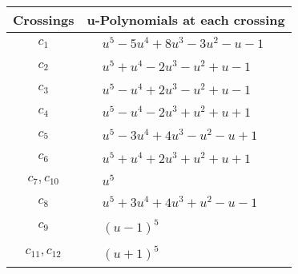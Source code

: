 \documentclass[1p]{elsarticle_modified}
\theoremstyle{definition}
\begin{document}
\begin{tabular}{m{50pt}|m{274pt}}
Crossings & \hspace{64pt}u-Polynomials at each crossing \\
\hline $$\begin{aligned}c_{1}\end{aligned}$$&$\begin{aligned}
&u^5-5 u^4+8 u^3-3 u^2- u-1
\end{aligned}$\\
\hline $$\begin{aligned}c_{2}\end{aligned}$$&$\begin{aligned}
&u^5+u^4-2 u^3- u^2+u-1
\end{aligned}$\\
\hline $$\begin{aligned}c_{3}\end{aligned}$$&$\begin{aligned}
&u^5- u^4+2 u^3- u^2+u-1
\end{aligned}$\\
\hline $$\begin{aligned}c_{4}\end{aligned}$$&$\begin{aligned}
&u^5- u^4-2 u^3+u^2+u+1
\end{aligned}$\\
\hline $$\begin{aligned}c_{5}\end{aligned}$$&$\begin{aligned}
&u^5-3 u^4+4 u^3- u^2- u+1
\end{aligned}$\\
\hline $$\begin{aligned}c_{6}\end{aligned}$$&$\begin{aligned}
&u^5+u^4+2 u^3+u^2+u+1
\end{aligned}$\\
\hline $$\begin{aligned}c_{7},c_{10}\end{aligned}$$&$\begin{aligned}
&u^5
\end{aligned}$\\
\hline $$\begin{aligned}c_{8}\end{aligned}$$&$\begin{aligned}
&u^5+3 u^4+4 u^3+u^2- u-1
\end{aligned}$\\
\hline $$\begin{aligned}c_{9}\end{aligned}$$&$\begin{aligned}
&(u-1)^5
\end{aligned}$\\
\hline $$\begin{aligned}c_{11},c_{12}\end{aligned}$$&$\begin{aligned}
&(u+1)^5
\end{aligned}$\\
\hline
\end{tabular}\\~\\
\end{document}
